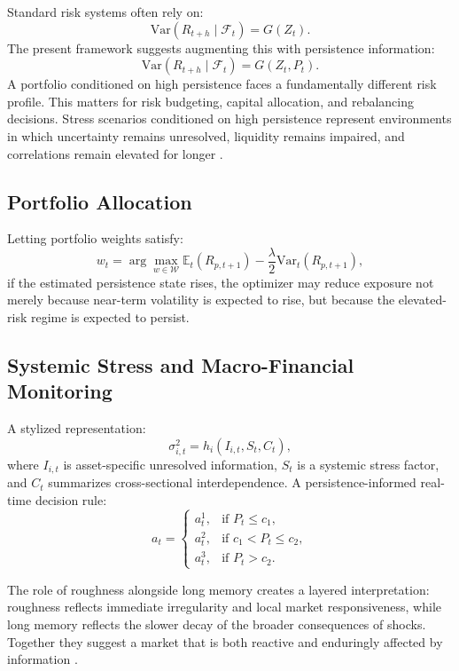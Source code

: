 \documentclass[12pt]{article}
\begin{document}
Standard risk systems often rely on:
\[
\mathrm{Var}(R_{t+h} \mid \mathcal{F}_t) = G(Z_t).
\]
The present framework suggests augmenting this with persistence information:
\[
\mathrm{Var}(R_{t+h} \mid \mathcal{F}_t) = G(Z_t, P_t).
\]
A portfolio conditioned on high persistence faces a fundamentally different risk profile. This matters for risk budgeting, capital allocation, and rebalancing decisions. Stress scenarios conditioned on high persistence represent environments in which uncertainty remains unresolved, liquidity remains impaired, and correlations remain elevated for longer \citep{Baillie1996, BarndorffNielsen2002}.

\subsection{Portfolio Allocation}

Letting portfolio weights satisfy:
\[
w_t = \arg\max_{w \in \mathcal{W}} \mathbb{E}_t(R_{p,t+1}) - \frac{\lambda}{2}\mathrm{Var}_t(R_{p,t+1}),
\]
if the estimated persistence state rises, the optimizer may reduce exposure not merely because near-term volatility is expected to rise, but because the elevated-risk regime is expected to persist.

\subsection{Systemic Stress and Macro-Financial Monitoring}

A stylized representation:
\[
\sigma_{i,t}^2 = h_i(I_{i,t}, S_t, C_t),
\]
where $I_{i,t}$ is asset-specific unresolved information, $S_t$ is a systemic stress factor, and $C_t$ summarizes cross-sectional interdependence. A persistence-informed real-time decision rule:
\[
a_t = \begin{cases}
a_t^1, & \text{if } P_t \le c_1, \\
a_t^2, & \text{if } c_1 < P_t \le c_2, \\
a_t^3, & \text{if } P_t > c_2.
\end{cases}
\]

The role of roughness alongside long memory creates a layered interpretation: roughness reflects immediate irregularity and local market responsiveness, while long memory reflects the slower decay of the broader consequences of shocks. Together they suggest a market that is both reactive and enduringly affected by information \citep{Gatheral2018, Andersen2003, Corsi2009}.

\end{document}
